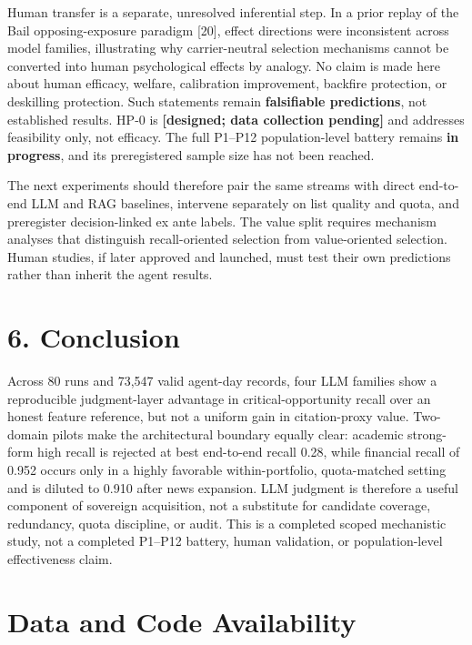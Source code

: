\documentclass[
  conference,10pt]{IEEEtran}
\begin{document}
Human transfer is a separate, unresolved inferential step. In a prior replay of the Bail opposing-exposure paradigm {[}20{]}, effect directions were inconsistent across model families, illustrating why carrier-neutral selection mechanisms cannot be converted into human psychological effects by analogy. No claim is made here about human efficacy, welfare, calibration improvement, backfire protection, or deskilling protection. Such statements remain \textbf{falsifiable predictions}, not established results. HP-0 is \textbf{{[}designed; data collection pending{]}} and addresses feasibility only, not efficacy. The full P1--P12 population-level battery remains \textbf{in progress}, and its preregistered sample size has not been reached.

The next experiments should therefore pair the same streams with direct end-to-end LLM and RAG baselines, intervene separately on list quality and quota, and preregister decision-linked ex ante labels. The value split requires mechanism analyses that distinguish recall-oriented selection from value-oriented selection. Human studies, if later approved and launched, must test their own predictions rather than inherit the agent results.

\section{6. Conclusion}\label{conclusion}

Across 80 runs and 73,547 valid agent-day records, four LLM families show a reproducible judgment-layer advantage in critical-opportunity recall over an honest feature reference, but not a uniform gain in citation-proxy value. Two-domain pilots make the architectural boundary equally clear: academic strong-form high recall is rejected at best end-to-end recall 0.28, while financial recall of 0.952 occurs only in a highly favorable within-portfolio, quota-matched setting and is diluted to 0.910 after news expansion. LLM judgment is therefore a useful component of sovereign acquisition, not a substitute for candidate coverage, redundancy, quota discipline, or audit. This is a completed scoped mechanistic study, not a completed P1--P12 battery, human validation, or population-level effectiveness claim.

\section{Data and Code Availability}\label{data-and-code-availability}
\end{document}

